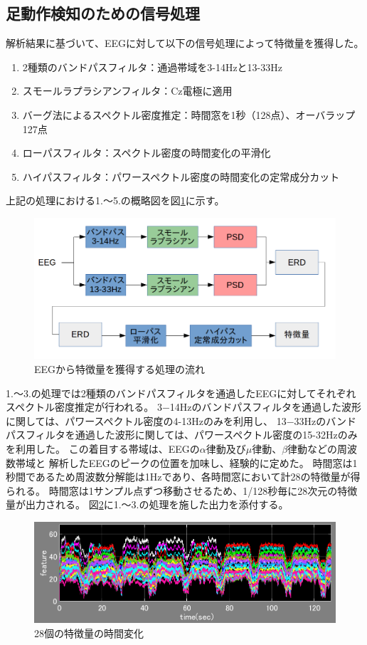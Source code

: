 \subsection{足動作検知のための信号処理}
解析結果に基づいて、EEGに対して以下の信号処理によって特徴量を獲得した。
\begin{enumerate}
    \item 2種類のバンドパスフィルタ：通過帯域を3-14Hzと13-33Hz
    \item スモールラプラシアンフィルタ：Cz電極に適用
    \item バーグ法によるスペクトル密度推定：時間窓を1秒（128点）、オーバラップ127点
    \item ローパスフィルタ：スペクトル密度の時間変化の平滑化
    \item ハイパスフィルタ：パワースペクトル密度の時間変化の定常成分カット
\end{enumerate}
上記の処理における1.〜5.の概略図を図\ref{fig:footBCI}に示す。
\begin{figure}
    \centering
    \includegraphics[width=13cm]{images/prepro.png}
    \caption{EEGから特徴量を獲得する処理の流れ}
    \label{fig:footBCI}
\end{figure}
1.〜3.の処理では2種類のバンドパスフィルタを通過したEEGに対してそれぞれスペクトル密度推定が行われる。
3−14Hzのバンドパスフィルタを通過した波形に関しては、パワースペクトル密度の4-13Hzのみを利用し、
13−33Hzのバンドパスフィルタを通過した波形に関しては、パワースペクトル密度の15-32Hzのみを利用した。
この着目する帯域は、EEGの\(\alpha\)律動及び\(\mu\)律動、\(\beta\)律動などの周波数帯域と
解析したEEGのピークの位置を加味し、経験的に定めた。
時間窓は1秒間であるため周波数分解能は1Hzであり、各時間窓において計28の特徴量が得られる。
時間窓は1サンプル点ずつ移動させるため、1/128秒毎に28次元の特徴量が出力される。
図\ref{fig:nofilterERD}に1.〜3.の処理を施した出力を添付する。
\begin{figure}[p]
    \centering
    \includegraphics[width=13cm]{images/feature_sub1_nofilter.png}
    \caption{28個の特徴量の時間変化}
    \label{fig:nofilterERD}
\end{figure}
